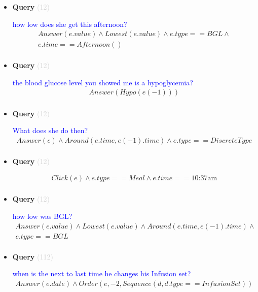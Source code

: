 \documentclass[11pt]{article}
\newcommand{\key}[1]{\textcolor{lightgray}{#1}}
\newcounter{CQuery}
\begin{document}
\begin{itemize}
\item
\textbf{Query\theCQuery} \key{(12)} \addtocounter{CQuery}{1}
\textcolor{blue}{ how low does she get this afternoon? }
\begin{multline*}
Answer(e.value) \wedge Lowest(e.value) \wedge e.type==BGL \wedge \\ 
e.time==Afternoon() \\ 
\end{multline*}


\item
\textbf{Query\theCQuery} \key{(12)} \addtocounter{CQuery}{1}
\textcolor{blue}{ the blood glucose level you showed me is a hypoglycemia? }
\begin{multline*}
Answer(Hypo(e(-1))) \\ 
\end{multline*}


\item
\textbf{Query\theCQuery} \key{(12)} \addtocounter{CQuery}{1}
\textcolor{blue}{ What does she do then? }
\begin{multline*}
Answer(e) \wedge Around(e.time, e(-1).time) \wedge e.type==DiscreteType \\ 
\end{multline*}


\item
\textbf{Query\theCQuery} \key{(12)} \addtocounter{CQuery}{1}
\textcolor{blue}{  }
\begin{multline*}
Click(e) \wedge e.type == Meal \wedge e.time==\mbox{10:37am} \\ 
\end{multline*}


\item
\textbf{Query\theCQuery} \key{(12)} \addtocounter{CQuery}{1}
\textcolor{blue}{ how low was BGL? }
\begin{multline*}
Answer(e.value) \wedge Lowest(e.value) \wedge Around(e.time, e(-1).time) \wedge \\ 
e.type==BGL \\ 
\end{multline*}


\item
\textbf{Query\theCQuery} \key{(112)} \addtocounter{CQuery}{1}
\textcolor{blue}{ when is the next to last time he changes his Infusion set? }
\begin{multline*}
Answer(e.date) \wedge Order(e, -2, Sequence(d, d.type==InfusionSet)) \\ 
\end{multline*}



\end{itemize}
\end{document}
